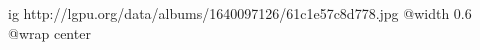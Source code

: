  
 
 
 
 

\ifcmt
  ig http://lgpu.org/data/albums/1640097126/61c1e57c8d778.jpg
  @width 0.6
	@wrap center
\fi
